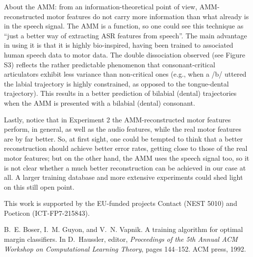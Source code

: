 \documentclass{pnastwo}
\begin{document}
\begin{article}
About the AMM: from an information-theoretical point of view, AMM-reconstructed
motor features do not carry more information than what already is in the speech signal.
The AMM is a function, so one could see this technique as
``just a better way of extracting ASR features from speech''.
The main advantage in using it is that it is highly bio-inspired,
having been trained to associated human speech data to motor data. The double dissociation
observed (see Figure S3) reflects the rather predictable phenomenon
that consonant-critical articulators exhibit less variance than non-critical ones (e.g.,
when a /b/ uttered the labial trajectory is highly constrained, as opposed to the tongue-dental
trajectory). This results in a better prediction of bilabial (dental) trajectories when the
AMM is presented with a bilabial (dental) consonant.

Lastly, notice that in Experiment 2 the AMM-reconstructed motor features perform, in general,
as well as the audio features, while the real motor features are by far better. So, at first
sight, one could be tempted to think that a better reconstruction should achieve better error
rates, getting close to those of the real motor features;
but on the other hand, the AMM uses the speech signal too, so it is not clear
whether a much better reconstruction can be achieved in our case at all. A larger training
database and more extensive experiments could shed light on this still open point.



\begin{acknowledgments}
  This work is supported by the EU-funded projects
  Contact (NEST 5010) and Poeticon (ICT-FP7-215843).
\end{acknowledgments}


% 
\begin{thebibliography}{99}

B.~E. Boser, I.~M. Guyon, and V.~N. Vapnik.
\newblock A training algorithm for optimal margin classifiers.
\newblock In D.~Haussler, editor, {\em Proceedings of the 5th Annual ACM
  Workshop on Computational Learning Theory}, pages 144--152. ACM press, 1992.


\end{thebibliography}
\end{article}
\end{document}
